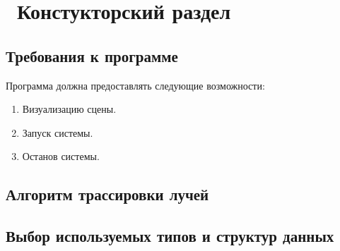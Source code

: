 \chapter{ Констукторский раздел}
\label{cha:design}


\section{Требования к программе}

Программа должна предоставлять следующие возможности:
\begin{enumerate}
	\item Визуализацию сцены.
	\item Запуск системы.
	\item Останов системы.
\end{enumerate}

\section{Алгоритм трассировки лучей}

\section{Выбор используемых типов и структур данных}
